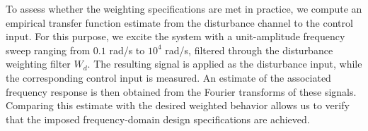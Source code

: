 To assess whether the weighting specifications are met in practice, we compute
an empirical transfer function estimate from the disturbance channel to the
control input. For this purpose, we excite the system with a unit-amplitude
frequency sweep ranging from $0.1$ rad/s to $10^{4}$ rad/s, filtered through
the disturbance weighting filter $W_d$. The resulting signal is applied as the
disturbance input, while the corresponding control input is measured. An
estimate of the associated frequency response is then obtained from the Fourier
transforms of these signals. Comparing this estimate with the desired weighted
behavior allows us to verify that the imposed frequency-domain design
specifications are achieved.
